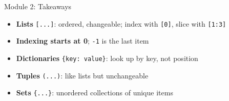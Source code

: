 \documentclass[aspectratio=169]{beamer}
\begin{document}
\begin{frame}{Module 2: Takeaways}
\vspace{0.3cm}
\begin{itemize}\setlength\itemsep{8pt}
  \item[\textcolor{wurgreen}{\faCheck}] \textbf{Lists} \texttt{[...]}: ordered, changeable; index with \texttt{[0]}, slice with \texttt{[1:3]}
  \item[\textcolor{wurgreen}{\faCheck}] \textbf{Indexing starts at 0}; \texttt{-1} is the last item
  \item[\textcolor{wurgreen}{\faCheck}] \textbf{Dictionaries} \texttt{\{key: value\}}: look up by key, not position
  \item[\textcolor{wurgreen}{\faCheck}] \textbf{Tuples} \texttt{(...)}: like lists but unchangeable
  \item[\textcolor{wurgreen}{\faCheck}] \textbf{Sets} \texttt{\{...\}}: unordered collections of unique items
\end{itemize}
\medskip
{}
\end{frame}
\end{document}
